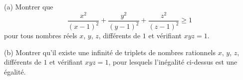 (a) Montrer que
\[
\frac{x^2}{(x-1)^2} + \frac{y^2}{(y-1)^2} + \frac{z^2}{(z-1)^2} \geqslant 1
\]
pour tous nombres réels $x$, $y$, $z$, différents de $1$ et vérifiant $xyz = 1$.

(b) Montrer qu'il existe une infinité de triplets de nombres rationnels $x$, $y$, $z$, différents de $1$ et
vérifiant $xyz = 1$, pour lesquels l'inégalité ci-dessus est une égalité.

